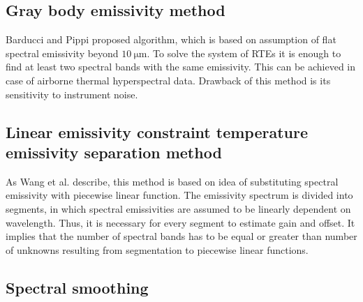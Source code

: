 \subsection*{Gray body emissivity method}

Barducci and Pippi \cite{BP96} proposed algorithm, which is based on assumption of flat spectral emissivity beyond $\SI{10}{\micro\meter}$. To solve the system of RTEs it is enough to find at least two spectral bands with the same emissivity. This can be achieved in case of airborne thermal hyperspectral data. Drawback of this method is its sensitivity to instrument noise.

\subsection*{Linear emissivity constraint temperature emissivity separation method}

As Wang et al. \cite{WW11} describe, this method is based on idea of substituting spectral emissivity with piecewise linear function. The emissivity spectrum is divided into segments, in which spectral emissivities are assumed to be linearly dependent on wavelength. Thus, it is necessary for every segment to estimate gain and offset. It implies that the number of spectral bands has to be equal or greater than number of unknowns resulting from segmentation to piecewise linear functions.

\subsection*{Spectral smoothing}

